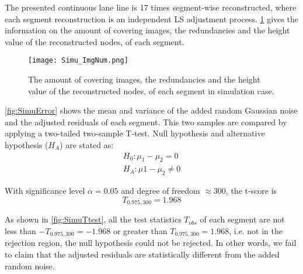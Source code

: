 

The presented continuous lane line is 17 times segment-wise reconstructed, where each segment reconstruction is an independent LS adjustment process. \cref{fig:SimuImgNum} gives the information on the amount of covering images, the redundancies and the height value of the reconstructed nodes, of each segment.

\begin{figure}
  \centering
  \texttt{[image: Simu\_ImgNum.png]}
  \caption{\small The amount of covering images, the redundancies and the height value of the reconstructed nodes, of each segment in simulation case.}
  \label{fig:SimuImgNum}
\end{figure}

\cref{fig:SimuError} shows the mean and variance of the added random Gaussian noise and the adjusted residuals of each segment. This two samples are compared by applying a two-tailed two-sample T-test. Null hypothesis and alternative hypothesis ($H_A$) are stated as:
\begin{equation*}
\begin{split}
H_0: \mu_1-\mu_2=0\\
H_A: \mu1-\mu_2\neq0
\end{split}
\end{equation*}

With significance level $\alpha=0.05$ and degree of freedom $\approx300$, the t-score is 
\begin{equation*}
T_{0.975,300}=1.968
\end{equation*}

As shown in \cref{fig:SimuTtest}, all the test statistics $T_{obs}$ of each segment are not less than $-T_{0.975,300}=-1.968$ or greater than $T_{0.975,300}=1.968$, i.e. not in the rejection region, the null hypothesis could not be rejected. In other words, we fail to claim that the adjusted residuals are statistically different from the added random noise.

